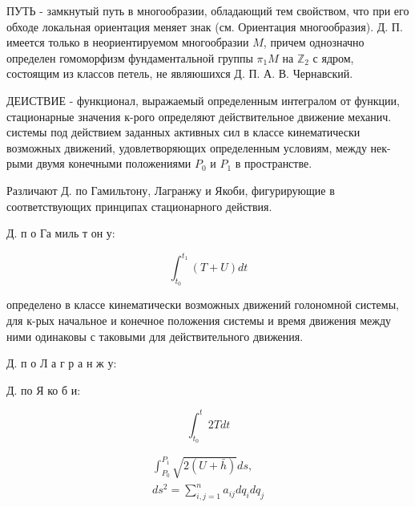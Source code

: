 \documentclass[10pt]{article}
\begin{document}
ПУТЬ - замкнутый путь в многообразии, обладающий тем свойством, что при его обходе локальная ориентация меняет знак (см. Ориентация многообразия). Д. П. имеется только в неориентируемом многообразии $M$, причем однозначно определен гомоморфизм фундаментальной группы $\pi_{1} M$ на $\mathbb{Z}_{2}$ с ядром, состоящим из классов петель, не являюшихся Д. П. А. В. Чернавский.



ДЕИСТВИЕ - функционал, выражаемый определенным интегралом от функции, стационарные значения к-рого определяют действительное движение механич. системы под действием заданных активных сил в классе кинематически возможных движений, удовлетворяющих определенным условиям, между нек-рыми двумя конечными положениями $P_{0}$ и $P_{1}$ в пространстве.



Различают Д. по Гамильтону, Лагранжу и Якоби, фигурирующие в соответствующих принципах стационарного действия.



Д. п о Га миль т он у:



\[

\int_{t_{0}}^{t_{1}}(T+U) d t

\]



определено в классе кинематически возможных движений голономной системы, для к-рых начальное и конечное положения системы и время движения между ними одинаковы с таковыми для действительного движения.



Д. п о Л а г р а н ж у:



Д. по Я ко б и:



\[

\int_{t_{0}}^{t} 2 T d t

\]



\[

\begin{gathered}

\int_{P_{0}}^{P_{1}} \sqrt{2(U+\bar{h})} d s, \\

d s^{2}=\sum_{i, j=1}^{n} a_{i j} d q_{i} d q_{j}

\end{gathered}

\]
\end{document}
